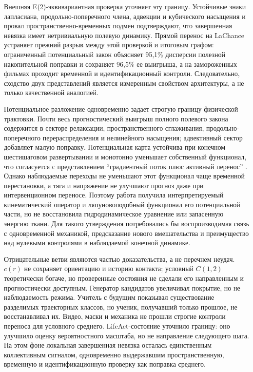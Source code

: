 \documentclass[11pt,a4paper]{article}
\begin{document}
Внешняя E(2)-эквивариантная проверка уточняет эту границу. Устойчивые знаки лапласиана, продольно-поперечного члена, адвекции и кубического насыщения и провал пространственно-временных подмен подтверждают, что завершенная невязка имеет нетривиальную полевую динамику. Прямой перенос на LaChance устраняет прежний разрыв между этой проверкой и итоговым графом: ограниченный потенциальный закон объясняет 95,1\% дисперсии полезной накопительной поправки и сохраняет 96,5\% ее выигрыша, а на замороженных фильмах проходит временной и идентификационный контроли. Следовательно, сходство двух представлений является измеренным свойством архитектуры, а не только качественной аналогией.

Потенциальное разложение одновременно задает строгую границу физической трактовки. Почти весь прогностический выигрыш полного полевого закона содержится в секторе релаксации, пространственного сглаживания, продольно-поперечного перераспределения и нелинейного насыщения; адвективный сектор добавляет малую поправку. Потенциальная карта устойчива при конечном шестишаговом развертывании и монотонно уменьшает собственный функционал, что согласуется с представлением ``градиентный поток плюс активный перенос'' \cite{ref2,ref32}. Однако наблюдаемые переходы не уменьшают этот функционал чаще временной перестановки, а тяга и напряжение не улучшают прогноз даже при интервенционном переносе. Поэтому работа получила интерпретируемый кинематический оператор и ляпуновоподобный функционал его потенциальной части, но не восстановила гидродинамическое уравнение или запасенную энергию ткани. Для такого утверждения потребовались бы воспроизводимая связь с одновременной механикой, предсказание нового вмешательства и преимущество над нулевыми контролями в наблюдаемой конечной динамике.

Отрицательные ветви являются частью доказательства, а не перечнем неудач. $c(r)$ не сохраняет ориентацию и историю контакта; условный $C(1,2)$ теоретически богаче, но проверенные состояния не сделали его направленным и прогностически доступным. Генератор кандидатов увеличивал покрытие, но не наблюдаемость режима. Учитель с будущим показывал существование разделимых траекторных классов, но ученик, получавший только прошлое, не восстанавливал их. Видео, маски и механика не прошли строгие контроли переноса для условного среднего. LifeAct-состояние уточнило границу: оно улучшило оценку вероятностного масштаба, но не направление следующего шага. На этом фоне локальная завершенная невязка осталась единственным коллективным сигналом, одновременно выдержавшим пространственную, временную и идентификационную проверку как поправка среднего.
\end{document}

